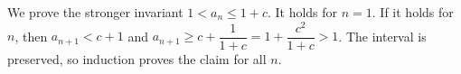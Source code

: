 We prove the stronger invariant $1<a_n\le 1+c$. It holds for $n=1$. If it holds for $n$, then $a_{n+1}<c+1$ and $a_{n+1}\ge c+\dfrac{1}{1+c}=1+\dfrac{c^2}{1+c}>1$. The interval is preserved, so induction proves the claim for all $n$.
